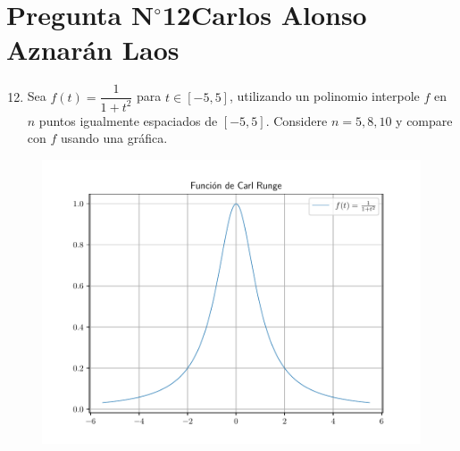 \section{Pregunta N$^{\circ}$12\qquad Carlos Alonso Aznarán Laos}

\begin{frame}
    \begin{enumerate}\setcounter{enumi}{11}
        \item

              Sea
              \begin{math}
                  f\left(t\right)=
                  \dfrac{1}{1+t^{2}}
              \end{math}
              para $t\in\left[-5,5\right]$, utilizando un polinomio
              interpole $f$ en $n$ puntos igualmente espaciados de
              $\left[-5,5\right]$.
              Considere $n=5,8,10$ y compare con $f$ usando una
              gráfica.
    \end{enumerate}

    \begin{solution}
        \begin{figure}[ht!]
            \centering
            \includegraphics[width=.72\paperwidth]{p12}
        \end{figure}
    \end{solution}
\end{frame}

